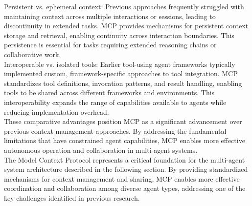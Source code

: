 Persistent vs. ephemeral context: Previous approaches frequently struggled with maintaining context across multiple interactions or sessions, leading to discontinuity in extended tasks. MCP provides mechanisms for persistent context storage and retrieval, enabling continuity across interaction boundaries. This persistence is essential for tasks requiring extended reasoning chains or collaborative work.\\ \newline
Interoperable vs. isolated tools: Earlier tool-using agent frameworks typically implemented custom, framework-specific approaches to tool integration. MCP standardizes tool definitions, invocation patterns, and result handling, enabling tools to be shared across different frameworks and environments. This interoperability expands the range of capabilities available to agents while reducing implementation overhead.\\ \newline
These comparative advantages position MCP as a significant advancement over previous context management approaches. By addressing the fundamental limitations that have constrained agent capabilities, MCP enables more effective autonomous operation and collaboration in multi-agent systems.\\ \newline
The Model Context Protocol represents a critical foundation for the multi-agent system architecture described in the following section. By providing standardized mechanisms for context management and sharing, MCP enables more effective coordination and collaboration among diverse agent types, addressing one of the key challenges identified in previous research.\\ \newline
